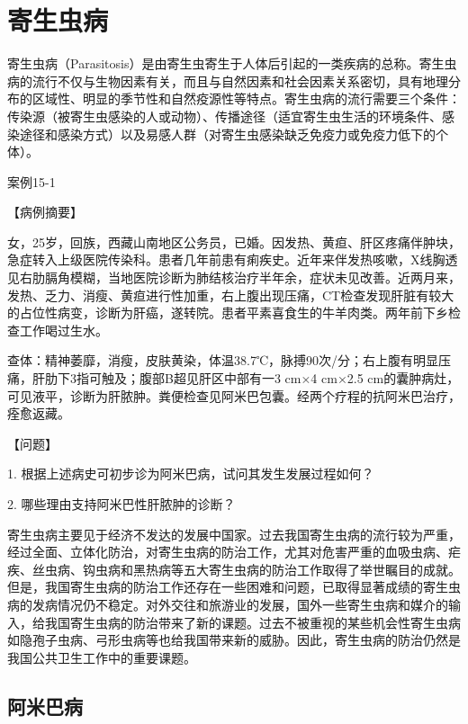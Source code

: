 \chapter{寄生虫病}


寄生虫病（Parasitosis）是由寄生虫寄生于人体后引起的一类疾病的总称。寄生虫病的流行不仅与生物因素有关，而且与自然因素和社会因素关系密切，具有地理分布的区域性、明显的季节性和自然疫源性等特点。寄生虫病的流行需要三个条件：传染源（被寄生虫感染的人或动物）、传播途径（适宜寄生虫生活的环境条件、感染途径和感染方式）以及易感人群（对寄生虫感染缺乏免疫力或免疫力低下的个体）。

\begin{framed}
{案例15-1}

{【病例摘要】}

女，25岁，回族，西藏山南地区公务员，已婚。因发热、黄疸、肝区疼痛伴肿块，急症转入上级医院传染科。患者几年前患有痢疾史。近年来伴发热咳嗽，X线胸透见右肋膈角模糊，当地医院诊断为肺结核治疗半年余，症状未见改善。近两月来，发热、乏力、消瘦、黄疸进行性加重，右上腹出现压痛，CT检查发现肝脏有较大的占位性病变，诊断为肝癌，遂转院。患者平素喜食生的牛羊肉类。两年前下乡检查工作喝过生水。

查体：精神萎靡，消瘦，皮肤黄染，体温38.7℃，脉搏90次/分；右上腹有明显压痛，肝肋下3指可触及；腹部B超见肝区中部有一3
cm×4 cm×2.5
cm的囊肿病灶，可见液平，诊断为肝脓肿。粪便检查见阿米巴包囊。经两个疗程的抗阿米巴治疗，痊愈返藏。

{【问题】}

1. 根据上述病史可初步诊为阿米巴病，试问其发生发展过程如何？

2. 哪些理由支持阿米巴性肝脓肿的诊断？
\end{framed}

寄生虫病主要见于经济不发达的发展中国家。过去我国寄生虫病的流行较为严重，经过全面、立体化防治，对寄生虫病的防治工作，尤其对危害严重的血吸虫病、疟疾、丝虫病、钩虫病和黑热病等五大寄生虫病的防治工作取得了举世瞩目的成就。但是，我国寄生虫病的防治工作还存在一些困难和问题，已取得显著成绩的寄生虫病的发病情况仍不稳定。对外交往和旅游业的发展，国外一些寄生虫病和媒介的输入，给我国寄生虫病的防治带来了新的课题。过去不被重视的某些机会性寄生虫病如隐孢子虫病、弓形虫病等也给我国带来新的威胁。因此，寄生虫病的防治仍然是我国公共卫生工作中的重要课题。

\section{阿米巴病}

